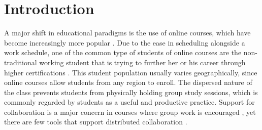 \documentclass{sig-alternate}
\begin{document}




%
%
%
%
%
%
%


\section{Introduction}
A major shift in educational paradigms is the use of online courses,
which have become increasingly more popular \cite{BELLER,DOE}.  Due to
the ease in scheduling alongside a work schedule, one of the common
type of students of online courses are the non-traditional working
student that is trying to further her or his career through higher
certifications \cite{BURGESS:TRENDS}.  This student population usually
varies geographically, since online courses allow students from any
region to enroll.  The dispersed nature of the class prevents students
from physically holding group study sessions, which is commonly
regarded by students as a useful and productive practice.  Support for
collaboration is a major concern in courses where group work is
encouraged \cite{WELLS:COLLAB}, yet there are few tools that support
distributed collaboration \cite{BURGESS:TRENDS}.
\end{document}
